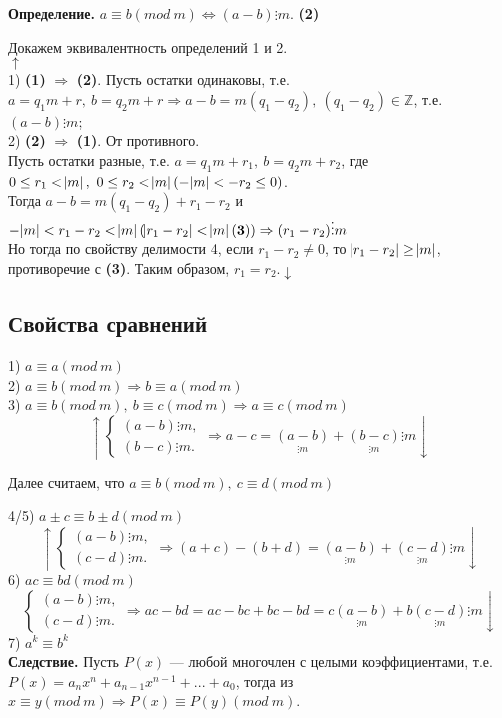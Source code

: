 \documentclass{article}
\begin{document}
    \textbf{Определение.} \( a \equiv b (mod\ m) \Leftrightarrow (a - b) \vdots m \). \textbf{(2)}

    Докажем эквивалентность определений 1 и 2.\\
    \( \uparrow \)\\
    1) \textbf{(1)} \( \Rightarrow \) \textbf{(2)}. Пусть остатки одинаковы, т.е. \( a = q_1m + r,\ b = q_2m + r \Rightarrow a - b = m(q_1 - q_2),\ (q_1 - q_2) \in \mathbb{Z} \), т.е. \( (a - b) \vdots m \);\\
    2) \textbf{(2)} \( \Rightarrow \) \textbf{(1)}. От противного.\\
    Пусть остатки разные, т.е. \( a = q_1m + r_1,\ b = q_2m + r_2 \), где \( 0 \leq r_1 < \abs{m},\ 0 \leq r_2 < \abs{m} (-\abs{m} < -r_2 \leq 0) \).\\
    Тогда \( a - b = m(q_1 - q_2) + r_1 - r_2 \) и \( -\abs{m} < r_1 - r_2 < \abs{m} (\abs{r_1 - r_2} < \abs{m} \mathbf{(3)}) \Rightarrow (r_1 - r_2) \vdots m \)\\
    Но тогда по свойству делимости 4, если \( r_1 - r_2 \neq 0 \), то \( \abs{r_1 - r_2} \geq \abs{m} \), противоречие с \textbf{(3)}. Таким образом, \(r_1 = r_2. \downarrow \)

    \subsection{Свойства сравнений}
    1) \( a \equiv a (mod\ m) \)\\
    2) \( a \equiv b (mod\ m) \Rightarrow b \equiv a (mod\ m) \)\\
    3) \( a \equiv b (mod\ m),\ b \equiv c (mod\ m) \Rightarrow a \equiv c (mod\ m) \)
    \[ \uparrow
        \begin{cases}
            (a - b) \vdots m,\\
            (b - c) \vdots m.
        \end{cases} \Rightarrow a - c = \underset{\vdots m}{(a - b)} + \underset{\vdots m}{(b - c)} \vdots m \downarrow \]
    \centerline{Далее считаем, что \( a \equiv b (mod\ m),\ c \equiv d (mod\ m) \)}
    4/5) \( a \pm c \equiv b \pm d (mod\ m) \)
    \[ \uparrow
        \begin{cases}
            (a - b) \vdots m,\\
            (c - d) \vdots m.
        \end{cases}
    \Rightarrow (a + c) - (b + d) = \underset{\vdots m}{(a - b)} + \underset{\vdots m}{(c - d)} \vdots m \downarrow \]
    6) \( ac \equiv bd (mod\ m) \) 
    \[ 
        \begin{cases}
            (a - b) \vdots m,\\
            (c - d) \vdots m.
        \end{cases}
    \Rightarrow ac - bd = ac - bc + bc - bd = c\underset{\vdots m}{(a - b)} + b\underset{\vdots m}{(c - d)} \vdots m \downarrow \]
    7) \( a^k \equiv b^k \)\\
    \textbf{Следствие.} Пусть \(P(x)\) --- любой многочлен с целыми коэффициентами, т.е. \(P(x) = a_nx^n + a_{n - 1}x^{n - 1} + ... + a_0\), тогда из \(x \equiv y (mod\ m) \Rightarrow P(x) \equiv P(y) (mod\ m)\).
\end{document}
